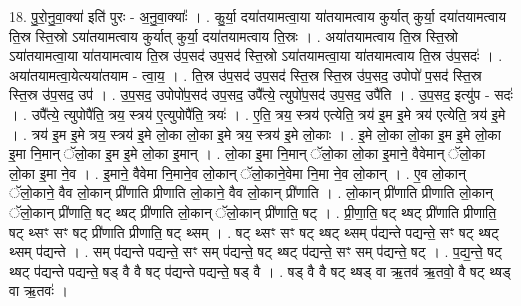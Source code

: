 \documentclass[17pt]{extarticle}
\begin{document}
18. पु॒रो॒नु॒वा॒क्या॑ इति॑ पुरः - अ॒नु॒वा॒क्याः᳚ । . कु॒र्या॒ दया॑तयामत्वा॒या या॑तयामत्वाय कुर्यात् कुर्या॒ दया॑तयामत्वाय ति॒स्र स्ति॒स्रो ऽया॑तयामत्वाय कुर्यात् कुर्या॒ दया॑तयामत्वाय ति॒स्रः । . अया॑तयामत्वाय ति॒स्र स्ति॒स्रो ऽया॑तयामत्वा॒या या॑तयामत्वाय ति॒स्र उ॑प॒सद॑ उप॒सद॑ स्ति॒स्रो ऽया॑तयामत्वा॒या या॑तयामत्वाय ति॒स्र उ॑प॒सदः॑ । . अया॑तयामत्वा॒येत्यया॑तयाम - त्वा॒य॒ । . ति॒स्र उ॑प॒सद॑ उप॒सद॑ स्ति॒स्र स्ति॒स्र उ॑प॒सद॒ उपोपो॑ प॒सद॑ स्ति॒स्र स्ति॒स्र उ॑प॒सद॒ उप॑ । . उ॒प॒सद॒ उपोपो॑प॒सद॑ उप॒सद॒ उपै᳚त्ये॒ त्युपो॑प॒सद॑ उप॒सद॒ उपै॑ति । . उ॒प॒सद॒ इत्यु॑प - सदः॑ । . उपै᳚त्ये॒ त्युपोपै॑ति॒ त्रय॒ स्त्रय॑ ए॒त्युपोपै॑ति॒ त्रयः॑ । . ए॒ति॒ त्रय॒ स्त्रय॑ एत्येति॒ त्रय॑ इ॒म इ॒मे त्रय॑ एत्येति॒ त्रय॑ इ॒मे । . त्रय॑ इ॒म इ॒मे त्रय॒ स्त्रय॑ इ॒मे लो॒का लो॒का इ॒मे त्रय॒ स्त्रय॑ इ॒मे लो॒काः । . इ॒मे लो॒का लो॒का इ॒म इ॒मे लो॒का इ॒मा नि॒मान् ॅलो॒का इ॒म इ॒मे लो॒का इ॒मान् । . लो॒का इ॒मा नि॒मान् ॅलो॒का लो॒का इ॒माने॒ वैवेमान् ॅलो॒का लो॒का इ॒मा ने॒व । . इ॒माने॒ वैवेमा नि॒माने॒व लो॒कान् ॅलो॒काने॒वेमा नि॒मा ने॒व लो॒कान् । . ए॒व लो॒कान् ॅलो॒काने॒ वैव लो॒कान् प्री॑णाति प्रीणाति लो॒काने॒ वैव लो॒कान् प्री॑णाति । . लो॒कान् प्री॑णाति प्रीणाति लो॒कान् ॅलो॒कान् प्री॑णाति॒ षट् थ्षट् प्री॑णाति लो॒कान् ॅलो॒कान् प्री॑णाति॒ षट् । . प्री॒णा॒ति॒ षट् थ्षट् प्री॑णाति प्रीणाति॒ षट् थ्सꣳ सꣳ षट् प्री॑णाति प्रीणाति॒ षट् थ्सम् । . षट् थ्सꣳ सꣳ षट् थ्षट् थ्सम् प॑द्यन्ते पद्यन्ते॒ सꣳ षट् थ्षट् थ्सम् प॑द्यन्ते । . सम् प॑द्यन्ते पद्यन्ते॒ सꣳ सम् प॑द्यन्ते॒ षट् थ्षट् प॑द्यन्ते॒ सꣳ सम् प॑द्यन्ते॒ षट् । . प॒द्य॒न्ते॒ षट् थ्षट् प॑द्यन्ते पद्यन्ते॒ षड् वै वै षट् प॑द्यन्ते पद्यन्ते॒ षड् वै । . षड् वै वै षट् थ्षड् वा ऋ॒तव॑ ऋ॒तवो॒ वै षट् थ्षड् वा ऋ॒तवः॑ । \newline
\end{document}
